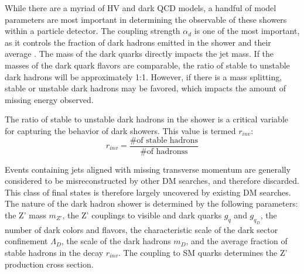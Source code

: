 While there are a myriad of HV and dark QCD models, a handful of model parameters are most important in determining the observable of these showers within a particle detector. The coupling strength $\alpha_d$ is one of the most important, as it controls the fraction of dark hadrons emitted in the shower and their average \pt. The mass of the dark quarks directly impacts the jet mass. If the masses of the dark quark flavors are comparable, the ratio of stable to unstable dark hadrons will be approximately 1:1. However, if there is a mass splitting, stable or unstable dark hadrons may be favored, which impacts the amount of missing energy observed. \par

The ratio of stable to unstable dark hadrons in the shower is a critical variable for capturing the behavior of dark showers. This value is termed $r_{inv}$:
\begin{equation}
	r_{inv} = \frac{\textrm{\# of stable hadrons}}{\textrm{\# of hadronss}}
\end{equation}

Events containing jets aligned with missing transverse momentum are generally considered to be misreconstructed by other DM searches, and therefore discarded. This class of final states is therefore largely uncovered by existing DM searches. The nature of the dark hadron shower is determined by the following parameters: the Z' mass $m_{Z'}$, the Z' couplings to visible and dark quarks $g_q$ and $g_{q_D}$, the number of dark colors and flavors, the characteristic scale of the dark sector confinement $\Lambda_D$, the scale of the dark hadrons $m_D$, and the average fraction of stable hadrons in the decay $r_{inv}$. The coupling to SM quarks determines the Z' production cross section.

